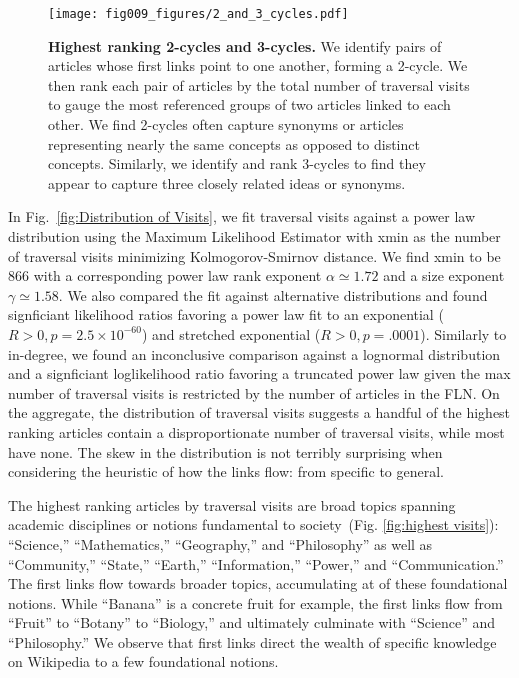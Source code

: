 \documentclass[pre,twocolumn,twoside,superscriptaddress,floatfix]{revtex4-1}
\begin{document}
{\begin{figure*}[tph!]
  \texttt{[image: fig009\_figures/2\_and\_3\_cycles.pdf]}
  \caption{
    \textbf{Highest ranking 2-cycles and 3-cycles.}
We identify pairs of articles whose first links point to one another, forming
a 2-cycle. We then rank each pair of articles by the total number of 
traversal visits to gauge the most referenced groups of two articles linked
to each other. We find 2-cycles often capture synonyms or articles representing nearly the 
same concepts as opposed to distinct concepts. Similarly, we identify and 
rank 3-cycles to find they appear to capture three closely related ideas or synonyms.}
  \label{fig:cycles}
\end{figure*}
In Fig.~\ref{fig:Distribution of Visits}, we fit traversal visits against a power law distribution using the Maximum Likelihood Estimator with xmin as the number of traversal visits minimizing Kolmogorov-Smirnov distance. We find xmin to be 866 with a corresponding power law rank exponent $\alpha \simeq 1.72$ and a size exponent $\gamma \simeq 1.58$.
We also compared the fit against alternative distributions and found signficiant likelihood ratios favoring a power law fit to an exponential ($R>0, p=2.5\times10^{-60}$) and stretched exponential ($R > 0, p=.0001$).
Similarly to in-degree, we found an inconclusive comparison against a lognormal distribution and a signficiant loglikelihood ratio favoring a truncated power law given the max number of traversal visits is restricted by the number of articles in the FLN. 
On the aggregate, the distribution of traversal visits suggests
a handful of the highest ranking articles contain a disproportionate number of traversal visits, while most have none. The skew in the distribution is not terribly surprising when considering the heuristic of how the links flow: from specific to general. 

The highest ranking articles by traversal visits are broad topics spanning academic disciplines 
or notions fundamental to society~(Fig. \ref{fig:highest visits}): ``Science,'' ``Mathematics,'' ``Geography,'' and ``Philosophy''
as well as ``Community,'' ``State,'' ``Earth,'' ``Information,'' ``Power,'' and ``Communication.''
The first links flow towards broader topics, accumulating at of these foundational notions.
While ``Banana'' is a concrete fruit for example, 
the first links flow from ``Fruit'' to ``Botany'' to ``Biology,'' and ultimately 
culminate with ``Science'' and ``Philosophy.'' 
We observe that first links direct the wealth of specific knowledge on Wikipedia to 
a few foundational notions.

}
\end{document}
